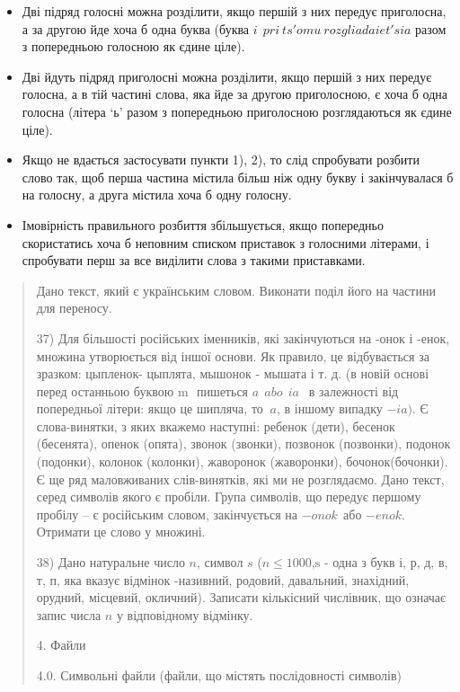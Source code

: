 \documentclass[]{article}
\begin{document}
\begin{itemize}
\item
  Дві підряд голосні можна розділити, якщо першій з них передує
  приголосна, а за другою йде хоча б одна буква (буква
  \(i\ \ pri\ ts'omu\ rozgliadaiet'sia\) разом з попередньою голосною як
  єдине ціле).
\item
  Дві йдуть підряд приголосні можна розділити, якщо першій з них передує
  голосна, а в тій частині слова, яка йде за другою приголосною, є хоча
  б одна голосна (літера `ь' разом з попередньою приголосною
  розглядаються як єдине ціле).
\item
  Якщо не вдається застосувати пункти 1), 2), то слід спробувати розбити
  слово так, щоб перша частина містила більш ніж одну букву і
  закінчувалася б на голосну, а друга містила хоча б одну голосну.
\item
  Імовірність правильного розбиття збільшується, якщо попередньо
  скористатись хоча б неповним списком приставок з голосними літерами, і
  спробувати перш за все виділити слова з такими приставками.
\end{itemize}

\begin{quote}
Дано текст, який є українським словом. Виконати поділ його на частини
для переносу.

37) Для більшості російських іменників, які закінчуються на -онок і
-енок, множина утворюється від іншої основи. Як правило, це відбувається
за зразком: цыпленок- цыплята, мышонок - мышата і т. д. (в новій основі
перед останньою буквою \(\text{m\ }\) пишеться \(a\ \ abo\ \ ia\ \ \) в
залежності від попередньої літери: якщо це шипляча, то \(\ a\), в іншому
випадку \(- ia)\). Є слова-винятки, з яких вкажемо наступні: ребенок
(дети), бесенок (бесенята), опенок (опята), звонок (звонки), позвонок
(позвонки), подонок (подонки), колонок (колонки), жаворонок (жаворонки),
бочонок(бочонки). Є ще ряд маловживаних слів-винятків, які ми не
розглядаємо. Дано текст, серед символів якого є пробіли. Група символів,
що передує першому пробілу -- є російським словом, закінчується на
\(- onok\ \ \)або \(- enok\). Отримати це слово у множині.

38) Дано натуральне число \(n\), символ \(s\)
(\(n \leq 1000\),\(\text{s\ }\)- одна з букв і, р, д, в, т, п, яка
вказує відмінок -називний, родовий, давальний, знахідний, орудний,
місцевий, окличний). Записати кількісний числівник, що означає запис
числа \(n\) у відповідному відмінку.

\protect\hypertarget{_Hlk48904419}{}{}4. Файли

4.0. Символьні файли (файли, що містять послідовності символів)
\end{quote}
\end{document}
